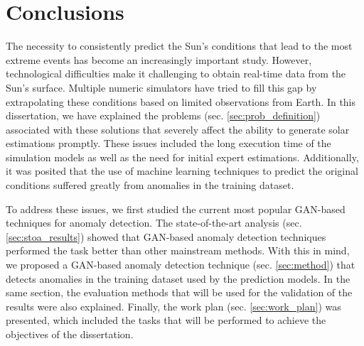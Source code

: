 \chapter{Conclusions} \label{chap:conclusion}

The necessity to consistently predict the Sun's conditions that lead to the most extreme events has become an increasingly important study. However, technological difficulties make it challenging to obtain real-time data from the Sun's surface. Multiple numeric simulators have tried to fill this gap by extrapolating these conditions based on limited observations from Earth. In this dissertation, we have explained the problems (sec. \ref{sec:prob_definition}) associated with these solutions that severely affect the ability to generate solar estimations promptly. These issues included the long execution time of the simulation models as well as the need for initial expert estimations. Additionally, it was posited that the use of machine learning techniques to predict the original conditions suffered greatly from anomalies in the training dataset.

To address these issues, we first studied the current most popular GAN-based techniques for anomaly detection. The state-of-the-art analysis (sec. \ref{sec:stoa_results}) showed that GAN-based anomaly detection techniques performed the task better than other mainstream methods. With this in mind, we proposed a GAN-based anomaly detection technique (sec. \ref{sec:method}) that detects anomalies in the training dataset used by the prediction models. In the same section, the evaluation methods that will be used for the validation of the results were also explained. Finally, the work plan (sec. \ref{sec:work_plan}) was presented, which included the tasks that will be performed to achieve the objectives of the dissertation.





